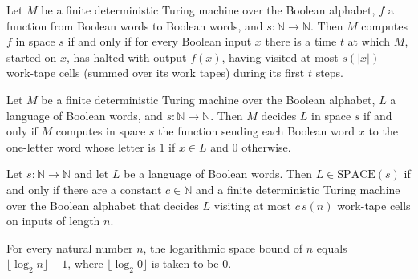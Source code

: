 \begin{theorem}
\label{Turing.FinTM.computesInSpace_iff}
\leanok
{}
Let $M$ be a finite deterministic Turing machine over the Boolean alphabet, $f$ a function from
Boolean words to Boolean words, and $s:\mathbb N\to\mathbb N$. Then $M$ computes $f$ in space
$s$ if and only if for every Boolean input $x$ there is a time $t$ at which $M$, started on
$x$, has halted with output $f(x)$, having visited at most $s(|x|)$ work-tape cells (summed over
its work tapes) during its first $t$ steps.
\end{theorem}

\begin{theorem}
\label{Turing.FinTM.decidesInSpace_iff}
\leanok
{}
Let $M$ be a finite deterministic Turing machine over the Boolean alphabet, $L$ a language of
Boolean words, and $s:\mathbb N\to\mathbb N$. Then $M$ decides $L$ in space $s$ if and only if
$M$ computes in space $s$ the function sending each Boolean word $x$ to the one-letter word
whose letter is $1$ if $x\in L$ and $0$ otherwise.
\end{theorem}

\begin{theorem}
\label{Complexity.mem_SPACE_iff}
\leanok
{}
Let $s:\mathbb N\to\mathbb N$ and let $L$ be a language of Boolean words. Then
$L\in\mathrm{SPACE}(s)$ if and only if there are a constant $c\in\mathbb N$ and a finite
deterministic Turing machine over the Boolean alphabet that decides $L$ visiting at most
$c\,s(n)$ work-tape cells on inputs of length $n$.
\end{theorem}

\begin{theorem}
\label{Complexity.logSpace_eq}
\leanok
{}
For every natural number $n$, the logarithmic space bound of $n$ equals
$\lfloor\log_2 n\rfloor+1$, where $\lfloor\log_2 0\rfloor$ is taken to be $0$.
\end{theorem}

